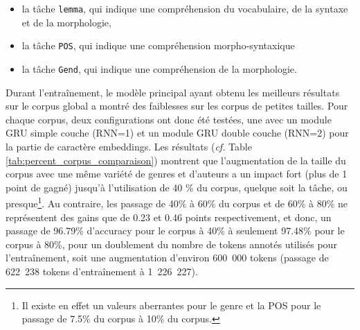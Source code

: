 \begin{itemize}
    \item la tâche \texttt{lemma}, qui indique une compréhension du vocabulaire, de la syntaxe et de la morphologie,
    \item la tâche \texttt{POS}, qui indique une compréhension morpho-syntaxique
    \item la tâche \texttt{Gend}, qui indique une compréhension de la morphologie.
\end{itemize}

Durant l'entraînement, le modèle principal ayant obtenu les meilleurs résultats sur le corpus global a montré des faiblesses sur les corpus de petites tailles. Pour chaque corpus, deux configurations ont donc été testées, une avec un module GRU simple couche (RNN=1) et un module GRU double couche (RNN=2) pour la partie de caractère embeddings. Les résultats (\textit{cf.} Table \ref{tab:percent_corpus_comparaison}) montrent que l'augmentation de la taille du corpus avec une même variété de genres et d'auteurs a un impact fort (plus de 1 point de gagné) jusqu'à l'utilisation de 40 \% du corpus, quelque soit la tâche, ou presque\footnote{Il existe en effet un valeurs aberrantes pour le genre et la POS pour le passage de 7.5\% du corpus à 10\% du corpus.}. Au contraire, les passage de 40\% à 60\% du corpus et de 60\% à 80\% ne représentent des gains que de 0.23 et 0.46 points respectivement, et donc, un passage de 96.79\% d'accuracy pour le corpus à 40\% à seulement 97.48\% pour le corpus à 80\%, pour un doublement du nombre de tokens annotés utilisés pour l'entraînement, soit une augmentation d'environ 600~000 tokens (passage de 622~238 tokens d'entraînement à 1~226~227).


